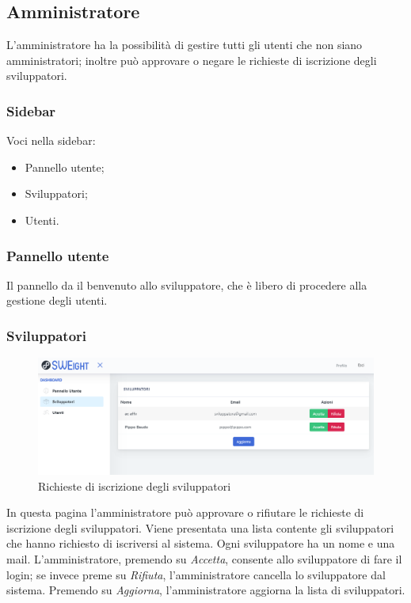 	\newpage
	\subsection{Amministratore}
	L'amministratore ha la possibilità di gestire tutti gli utenti che non siano amministratori; inoltre può approvare o negare le richieste di iscrizione degli sviluppatori.
		\subsubsection{Sidebar}
		  Voci nella sidebar:
			\begin{itemize}
				\item Pannello utente;
				\item Sviluppatori;
				\item Utenti.
			\end{itemize}



		\subsubsection{Pannello utente}
		 Il pannello da il benvenuto allo sviluppatore, che è libero di procedere alla gestione degli utenti.




		\subsubsection{Sviluppatori}
			\begin{figure}[H]
				\centering
				\includegraphics[width=17cm]{sez/img/amministratore/conf_ric_svil.PNG}
				\caption{Richieste di iscrizione degli sviluppatori}\label{fig:1}
			\end{figure}
		  In questa pagina l'amministratore può approvare o rifiutare le richieste di iscrizione degli sviluppatori. Viene presentata una lista contente gli sviluppatori che hanno richiesto di iscriversi al sistema. Ogni sviluppatore ha un nome e una mail. L'amministratore, premendo su \textit{Accetta}, consente allo sviluppatore di fare il login; se invece preme su \textit{Rifiuta}, l'amministratore cancella lo sviluppatore dal sistema. Premendo su \textit{Aggiorna}, l'amministratore aggiorna la lista di sviluppatori.


